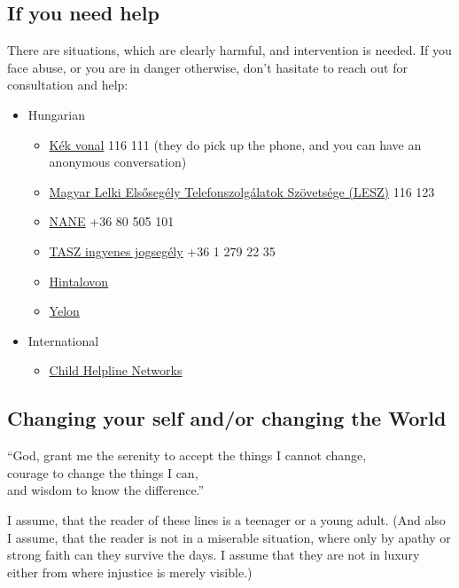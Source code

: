 \documentclass{article}
\begin{document}
\subsection{If you need help}

There are situations, which are clearly harmful, and intervention is needed. If you face abuse, or you are in danger otherwise, don't hasitate to reach out for consultation and help:

\begin{itemize}
\item Hungarian
\begin{itemize}
    \item \href{https://kek-vonal.hu/}{Kék vonal} 116 111 (they do pick up the phone, and you can have an anonymous conversation)
    \item \href{https://sos116-123.hu/}{Magyar Lelki Elsősegély Telefonszolgálatok
Szövetsége (LESZ)} 116 123
    \item \href{https://nane.hu/}{NANE} +36 80 505 101
    \item \href{https://tasz.hu/ingyenes-jogsegelyszolgalat}{TASZ ingyenes jogsegély} +36 1 279 22 35
    \item \href{https://hintalovon.hu/}{Hintalovon}
    \item \href{https://yelon.hu/}{Yelon}
\end{itemize}

\item International
\begin{itemize}
\item \href{https://www.childhelplineinternational.org/child-helplines/child-helpline-network/}{Child Helpline Networks}
\end{itemize}
\end{itemize}

\subsection{Changing your self and/or changing the World}

\vspace{1cm}
{``God, grant me the serenity to accept the things I cannot change,\\
courage to change the things I can,\\
and wisdom to know the difference.''
\\[5pt]
}

I assume, that the reader of these lines is a teenager or a young adult. (And also I assume, that the reader is not in a miserable situation, where only by apathy or strong faith can they survive the days. I assume that they are not in luxury either from where injustice is merely visible.)
\end{document}

